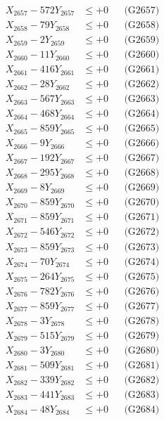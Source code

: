\documentclass[a4paper,10pt]{article}
\begin{document}
{\begin{align}
X_{2657} - 572Y_{2657} &\leq +0 && \text{(G2657)} \\
X_{2658} - 79Y_{2658} &\leq +0 && \text{(G2658)} \\
X_{2659} - 2Y_{2659} &\leq +0 && \text{(G2659)} \\
X_{2660} - 11Y_{2660} &\leq +0 && \text{(G2660)} \\
\allowbreak
X_{2661} - 416Y_{2661} &\leq +0 && \text{(G2661)} \\
X_{2662} - 28Y_{2662} &\leq +0 && \text{(G2662)} \\
X_{2663} - 567Y_{2663} &\leq +0 && \text{(G2663)} \\
X_{2664} - 468Y_{2664} &\leq +0 && \text{(G2664)} \\
X_{2665} - 859Y_{2665} &\leq +0 && \text{(G2665)} \\
X_{2666} - 9Y_{2666} &\leq +0 && \text{(G2666)} \\
X_{2667} - 192Y_{2667} &\leq +0 && \text{(G2667)} \\
X_{2668} - 295Y_{2668} &\leq +0 && \text{(G2668)} \\
X_{2669} - 8Y_{2669} &\leq +0 && \text{(G2669)} \\
X_{2670} - 859Y_{2670} &\leq +0 && \text{(G2670)} \\
\allowbreak
X_{2671} - 859Y_{2671} &\leq +0 && \text{(G2671)} \\
X_{2672} - 546Y_{2672} &\leq +0 && \text{(G2672)} \\
X_{2673} - 859Y_{2673} &\leq +0 && \text{(G2673)} \\
X_{2674} - 70Y_{2674} &\leq +0 && \text{(G2674)} \\
X_{2675} - 264Y_{2675} &\leq +0 && \text{(G2675)} \\
X_{2676} - 782Y_{2676} &\leq +0 && \text{(G2676)} \\
X_{2677} - 859Y_{2677} &\leq +0 && \text{(G2677)} \\
X_{2678} - 3Y_{2678} &\leq +0 && \text{(G2678)} \\
X_{2679} - 515Y_{2679} &\leq +0 && \text{(G2679)} \\
X_{2680} - 3Y_{2680} &\leq +0 && \text{(G2680)} \\
\allowbreak
X_{2681} - 509Y_{2681} &\leq +0 && \text{(G2681)} \\
X_{2682} - 339Y_{2682} &\leq +0 && \text{(G2682)} \\
X_{2683} - 441Y_{2683} &\leq +0 && \text{(G2683)} \\
X_{2684} - 48Y_{2684} &\leq +0 && \text{(G2684)} \\

\end{align}}
\end{document}
